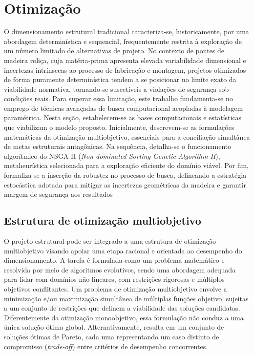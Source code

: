 \section{Otimização}\label{sec:otimizacao}

O dimensionamento estrutural tradicional caracteriza-se, historicamente, por uma abordagem determinística e sequencial, frequentemente restrita à exploração de um número limitado de alternativas de projeto. No contexto de pontes de madeira roliça, cuja matéria-prima apresenta elevada variabilidade dimensional e incertezas intrínsecas ao processo de fabricação e montagem, projetos otimizados de forma puramente determinística tendem a se posicionar no limite exato da viabilidade normativa, tornando-se suscetíveis a violações de segurança sob condições reais. Para superar essa limitação, este trabalho fundamenta-se no emprego de técnicas avançadas de busca computacional acopladas à modelagem paramétrica. 
Nesta seção, estabelecem-se as bases computacionais e estatísticas que viabilizam o modelo proposto. Inicialmente, descrevem-se as formulações matemáticas da otimização multiobjetivo, essenciais para a conciliação simultânea de metas estruturais antagônicas. Na sequência, detalha-se o funcionamento algorítmico do NSGA-II (\textit{Non-dominated Sorting Genetic Algorithm II}), metaheurística selecionada para a exploração eficiente do domínio viável. Por fim, formaliza-se a inserção da robustez no processo de busca, delineando a estratégia estocástica adotada para mitigar as incertezas geométricas da madeira e garantir margem de segurança aos resultados

\subsection{Estrutura de otimização multiobjetivo}\label{sec:otim_multiobjetivo}

 O projeto estrutural pode ser integrado a uma estrutura de otimização multiobjetivo visando apoiar uma etapa racional e orientada ao desempenho do dimensionamento. A tarefa é formulada como um problema matemático e resolvida por meio de algoritmos evolutivos, sendo uma abordagem adequada para lidar com domínios não lineares, com restrições rigorosas e múltiplos objetivos conflitantes.
 Um problema de otimização multiobjetivo envolve a minimização e/ou maximização simultânea de múltiplas funções objetivo, sujeitas a um conjunto de restrições que definem a viabilidade das soluções candidatas. Diferentemente da otimização monoobjetivo, essa formulação não conduz a uma única solução ótima global. Alternativamente, resulta em um conjunto de soluções ótimas de Pareto, cada uma representando um caso distinto de compromisso (\textit{trade-off}) entre critérios de desempenho concorrentes.
 
